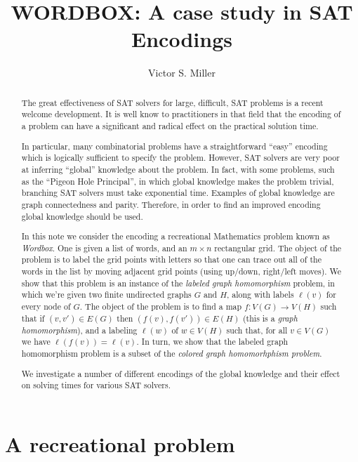\documentclass{article}
\title{WORDBOX: A case study in SAT Encodings}
\author{Victor S. Miller}
\affil{IDA Center for Communications Research, Princeton, NJ 08540
USA}
\begin{document}
\maketitle
\begin{abstract}
  The great effectiveness of SAT solvers for large, difficult, SAT
  problems is a recent welcome development.  It is well know to
  practitioners in that field that the encoding of a problem can have
  a significant and radical effect on the practical solution time.

  In particular, many combinatorial problems have a straightforward
  ``easy'' encoding which is logically sufficient to specify the
  problem.  However, SAT solvers are very poor at inferring ``global''
  knowledge about the problem.  In fact, with some problems, such as
  the ``Pigeon Hole Principal'', in which global knowledge makes the
  problem trivial, branching SAT solvers must take exponential time.
  Examples of global knowledge are graph connectedness and
  parity. Therefore, in order to find an improved encoding global
  knowledge should be used.

  In this note we consider the encoding a recreational Mathematics
  problem known as \emph{Wordbox}.  One is given a list of words, and
  an $m \times n$ rectangular grid.  The object of the problem is to
  label the grid points with letters so that one can trace out all of
  the words in the list by moving adjacent grid points (using up/down,
  right/left moves).  We show that this problem is an instance of the
  \emph{labeled graph homomorphism} problem, in which we're given two
  finite undirected graphs $G$ and $H$, along with labels $\ell(v)$ for
  every node of $G$.  The object of the problem is to find a map
  $f: V(G) \rightarrow V(H)$ such that if $(v,v') \in E(G)$ then
  $(f(v), f(v')) \in E(H)$ (this is a \emph{graph homomorphism}), and
  a labeling $\ell(w)$ of $w \in V(H)$ such that, for all $v \in V(G)$
  we have $\ell(f(v)) = \ell(v)$.  In turn, we show that the labeled
  graph homomorphism problem is a subset of the \emph{colored graph
    homomorhphism problem}.

  We investigate a number of different encodings of the global
  knowledge and their effect on solving times for various SAT solvers.
\end{abstract}

\section{A recreational problem}
\label{sec:recreational}
\end{document}
